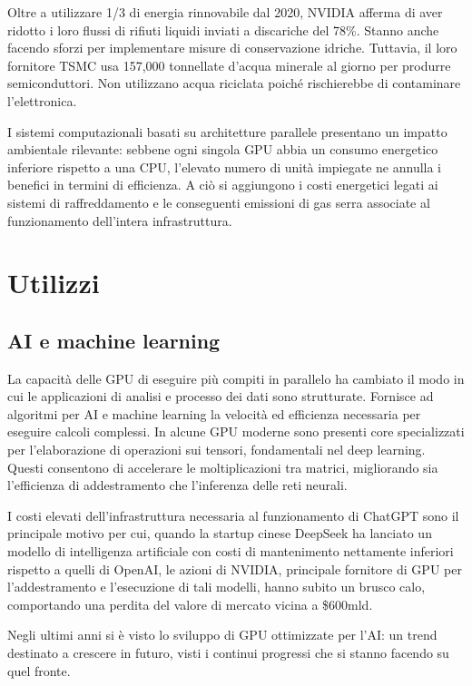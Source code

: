 \documentclass[12pt,a4paper,oneside]{book}
\begin{document}
Oltre a utilizzare 1/3 di energia rinnovabile dal 2020, NVIDIA afferma di aver ridotto i loro flussi di rifiuti liquidi inviati a discariche del 78\%. Stanno anche facendo sforzi per implementare misure di conservazione idriche. Tuttavia, il loro fornitore TSMC usa 157,000 tonnellate d'acqua minerale al giorno per produrre semiconduttori. Non utilizzano acqua riciclata poiché rischierebbe di contaminare l'elettronica.

I sistemi computazionali basati su architetture parallele presentano un impatto ambientale rilevante: sebbene ogni singola GPU abbia un consumo energetico inferiore rispetto a una CPU, l’elevato numero di unità impiegate ne annulla i benefici in termini di efficienza. A ciò si aggiungono i costi energetici legati ai sistemi di raffreddamento e le conseguenti emissioni di gas serra associate al funzionamento dell’intera infrastruttura.

\section{Utilizzi}

\subsection{AI e machine learning}

La capacità delle GPU di eseguire più compiti in parallelo ha cambiato il modo in cui le applicazioni di analisi e processo dei dati sono strutturate. Fornisce ad algoritmi per AI e machine learning la velocità ed efficienza necessaria per eseguire calcoli complessi.
In alcune GPU moderne sono presenti core specializzati per l'elaborazione di operazioni sui tensori, fondamentali nel deep learning. Questi consentono di accelerare le moltiplicazioni tra matrici, migliorando sia l'efficienza di addestramento che l'inferenza delle reti neurali.

I costi elevati dell’infrastruttura necessaria al funzionamento di ChatGPT sono il principale motivo per cui, quando la startup cinese DeepSeek ha lanciato un modello di intelligenza artificiale con costi di mantenimento nettamente inferiori rispetto a quelli di OpenAI, le azioni di NVIDIA, principale fornitore di GPU per l’addestramento e l’esecuzione di tali modelli,  hanno subito un brusco calo, comportando una perdita del valore di mercato vicina a \$600mld.

Negli ultimi anni si è visto lo sviluppo di GPU ottimizzate per l'AI: un trend destinato a crescere in futuro, visti i continui progressi che si stanno facendo su quel fronte.
\end{document}
